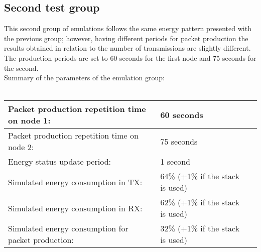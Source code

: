 \subsection{Second test group}
\label{sec:ST}
This second group of emulations follows the same energy pattern presented with the previous group; however, having different periods for packet production the results obtained in relation to the number of transmissions are slightly different. The production periods are set to 60 seconds for the first node and 75 seconds for the second.\\
Summary of the parameters of the emulation group:\\\\
\begin{tabular}{lll} \hline
Packet production repetition time on node 1: & 60 seconds\\ \hline
Packet production repetition time on node 2: & 75 seconds\\ \hline
Energy status update period: & 1 second \\ \hline
Simulated energy consumption in TX: & 64\% (+1\% if the stack is used)\\ \hline
Simulated energy consumption in RX: & 62\% (+1\% if the stack is used)\\ \hline
Simulated energy consumption for packet production: & 32\% (+1\% if the stack is used)\\ \hline
\end{tabular}
